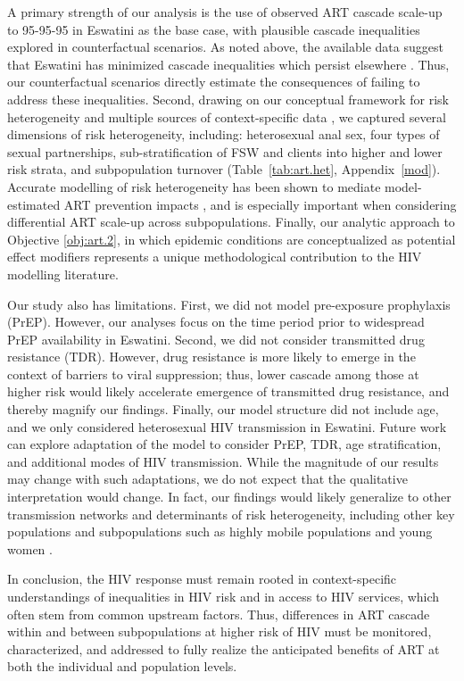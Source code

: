\par
A primary strength of our analysis is the use of
observed ART cascade scale-up to 95-95-95 in Eswatini as the base case,
with plausible cascade inequalities explored in counterfactual scenarios.
As noted above, the available data suggest that Eswatini has
minimized cascade inequalities which persist elsewhere \cite{Hakim2018}.
Thus, our counterfactual scenarios directly estimate
the consequences of failing to address these inequalities.
Second, drawing on our conceptual framework for risk heterogeneity \cite[Table~1]{Knight2022sr}
and multiple sources of context-specific data
\cite{SDHS2006,SHIMS1,SHIMS2,Baral2014,EswKP2014,EswIBBS2022},
we captured several dimensions of risk heterogeneity, including:
heterosexual anal sex,
four types of sexual partnerships,
sub-stratification of FSW and clients into higher and lower risk strata,
and subpopulation turnover
(Table~\ref{tab:art.het}, Appendix~\ref{mod}).
Accurate modelling of risk heterogeneity
has been shown to mediate model-estimated ART prevention impacts \cite{Hontelez2013},
and is especially important when considering differential ART scale-up across subpopulations.
Finally, our analytic approach to Objective \ref{obj:art.2},
in which epidemic conditions are conceptualized as potential effect modifiers
represents a unique methodological contribution to the HIV modelling literature.
\par
Our study also has limitations.
First, we did not model pre-exposure prophylaxis (PrEP).
However, our analyses focus on the time period
prior to widespread PrEP availability in Eswatini.
Second, we did not consider transmitted drug resistance (TDR).
However, drug resistance is more likely to emerge
in the context of barriers to viral suppression;
thus, lower cascade among those at higher risk
would likely accelerate emergence of transmitted drug resistance,
and thereby magnify our findings.
Finally, our model structure did not include age,
and we only considered heterosexual HIV transmission in Eswatini.
Future work can explore adaptation of the model to consider
PrEP, TDR, age stratification, and additional modes of HIV transmission.
While the magnitude of our results may change with such adaptations,
we do not expect that the qualitative interpretation would change.
In fact, our findings would likely generalize
to other transmission networks and determinants of risk heterogeneity,
including other key populations and subpopulations such as
highly mobile populations and young women \cite{Camlin2019,Cheuk2020}.
\par\pagebreak %
In conclusion, the HIV response must remain rooted in
context-specific understandings of inequalities in HIV risk and in access to HIV services,
which often stem from common upstream factors.
Thus, differences in ART cascade within and between subpopulations at higher risk of HIV
must be monitored, characterized, and addressed
to fully realize the anticipated benefits of ART
at both the individual and population levels.
